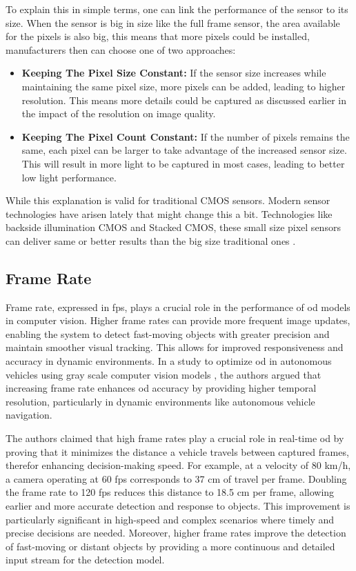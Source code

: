 To explain this in simple terms, one can link the performance of the sensor to its size. When the sensor is big in size like the full frame sensor, the area available for the pixels is also big, this means that more pixels could be installed, manufacturers then can choose one of two approaches:
\begin{itemize}
    \item \textbf{Keeping The Pixel Size Constant:} If the sensor size increases while maintaining the same pixel size, more pixels can be added, leading to higher resolution. This means more details could be captured as discussed earlier in the impact of the resolution on image quality.
    \item \textbf{Keeping The Pixel Count Constant:} If the number of pixels remains the same, each pixel can be larger to take advantage of the increased sensor size. This will result in more light to be captured in most cases, leading to better low light performance.
\end{itemize}


While this explanation is valid for traditional CMOS sensors. Modern sensor technologies have arisen lately that might change this a bit. Technologies like backside illumination CMOS and Stacked CMOS, these small size pixel sensors can deliver same or better results than the big size traditional ones \cite{Fisher_CMOS_Types_2024}.

\subsection{Frame Rate}

Frame rate, expressed in \gls{fps}, plays a crucial role in the performance of \gls{od} models in computer vision. Higher frame rates can provide more frequent image updates, enabling the system to detect fast-moving objects with greater precision and maintain smoother visual tracking. This allows for improved responsiveness and accuracy in dynamic environments. In a study to optimize \gls{od} in autonomous vehicles using gray scale computer vision models \cite{FPS}, the authors argued that increasing frame rate enhances \gls{od} accuracy by providing higher temporal resolution, particularly in dynamic environments like autonomous vehicle navigation.

The authors claimed that high frame rates play a crucial role in real-time \gls{od} by proving that it  minimizes the distance a vehicle travels between captured frames, therefor enhancing decision-making speed. For example, at a velocity of 80 km/h, a camera operating at 60 \gls{fps} corresponds to 37 cm of travel per frame. Doubling the frame rate to 120 \gls{fps} reduces this distance to 18.5 cm per frame, allowing earlier and more accurate detection and response to objects. This improvement is particularly significant in high-speed and complex scenarios where timely and precise decisions are needed. Moreover, higher frame rates improve the detection of fast-moving or distant objects by providing a more continuous and detailed input stream for the detection model.

